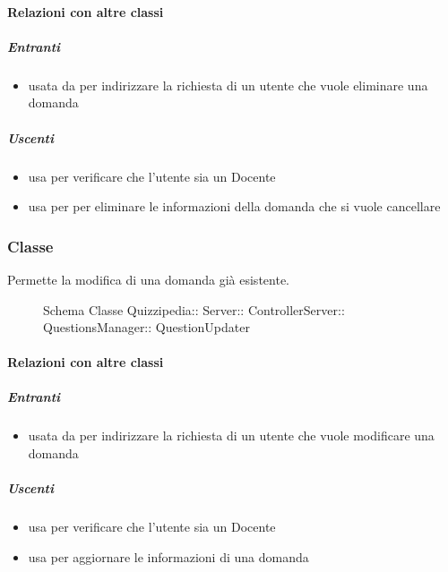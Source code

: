 \paragraph{Relazioni con altre classi}
\subparagraph{Entranti}
\begin{itemize}
\item usata da  per indirizzare la richiesta di un utente che vuole eliminare una domanda
\end{itemize}
\subparagraph{Uscenti}
\begin{itemize}
\item usa  per verificare che l'utente sia un Docente
\item usa  per per eliminare le informazioni della domanda che si vuole cancellare
\end{itemize}
\subsubsection{Classe }
Permette la modifica di una domanda già esistente.
\begin{figure}[H]
\centering
\noindent{}
\caption[Schema Classe QuestionUpdater]{Schema Classe Quizzipedia:: Server:: ControllerServer:: QuestionsManager:: QuestionUpdater}
\end{figure}
\paragraph{Relazioni con altre classi}
\subparagraph{Entranti}
\begin{itemize}
\item usata da  per indirizzare la richiesta di un utente che vuole modificare una domanda
\end{itemize}
\subparagraph{Uscenti}
\begin{itemize}
\item usa  per verificare che l'utente sia un Docente
\item usa  per aggiornare le informazioni di una domanda
\end{itemize}
